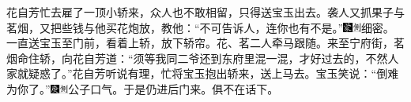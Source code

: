 花自芳忙去雇了一顶小轿来，众人也不敢相留，只得送宝玉出去。袭人又抓果子与茗烟，又把些钱与他买花炮放，教他：``不可告诉人，连你也有不是。''{\includegraphics[width=3mm]{../Images/00006}\includegraphics[width=3mm]{../Images/00011}\footnotesize \kaishu 细密。}一直送宝玉至门前，看着上轿，放下轿帘。花、茗二人牵马跟随。来至宁府街，茗烟命住轿，向花自芳道：``须等我同二爷还到东府里混一混，才好过去的，不然人家就疑惑了。''花自芳听说有理，忙将宝玉抱出轿来，送上马去。宝玉笑说：``倒难为你了。''{\includegraphics[width=3mm]{../Images/00004}\includegraphics[width=3mm]{../Images/00011}\footnotesize \kaishu 公子口气。}于是仍进后门来。俱不在话下。


